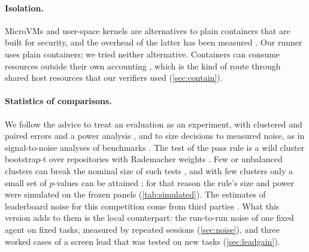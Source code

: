 \paragraph{Isolation.}
MicroVMs \citep{agache2020firecracker} and user-space kernels \citep{young2019gvisor} are alternatives to plain
containers that are built for security, and the overhead of the latter has been measured \citep{young2019gvisor}. Our
runner uses plain containers; we tried neither alternative. Containers can consume resources outside their own
accounting \citep{gao2019houdini}, which is the kind of route through shared host resources that our verifiers used
(\cref{sec:contain}).


\paragraph{Statistics of comparisons.}
We follow the advice to treat an evaluation as an experiment, with clustered and paired errors and a power analysis
\citep{miller2024errorbars}, and to size decisions to measured noise, as in signal-to-noise analyses of benchmarks
\citep{heineman2025signalnoise}. The test of the pass rule is a wild cluster bootstrap-t over repositories
\citep{cameron2008bootstrap} with Rademacher weights \citep{davidson2008wild}. Few or unbalanced clusters can break
the nominal size of such tests \citep{mackinnon2017wild,canay2021wild}, and with few clusters only a small set of
$p$-values can be attained \citep{webb2023reworking}; for that reason the rule's size and power were simulated on the
frozen panels (\cref{tab:simulated}). The estimates of leaderboard noise for this competition come from third parties
\citep{afshar2026census,mobassir2026toosmall}. What this version adds to them is the local counterpart: the run-to-run
noise of one fixed agent on fixed tasks, measured by repeated sessions (\cref{sec:noise}), and three worked cases of
a screen lead that was tested on new tasks (\cref{sec:leadgain}).
